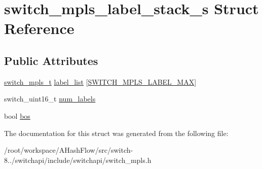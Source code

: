 \hypertarget{structswitch__mpls__label__stack__s}{\section{switch\+\_\+mpls\+\_\+label\+\_\+stack\+\_\+s Struct Reference}
\label{structswitch__mpls__label__stack__s}
}
\subsection*{Public Attributes}
\begin{DoxyCompactItemize}
\item 
\hyperlink{group__Tunnel_gaa1a400888248e1e756adbd37f010f288}{switch\+\_\+mpls\+\_\+t} \hyperlink{group__Tunnel_gaf21845a304f409165053ed260fc8da3e}{label\+\_\+list} \mbox{[}\hyperlink{group__Tunnel_ga358d11e6167bb874159a7b6ac253221b}{S\+W\+I\+T\+C\+H\+\_\+\+M\+P\+L\+S\+\_\+\+L\+A\+B\+E\+L\+\_\+\+M\+A\+X}\mbox{]}
\item 
switch\+\_\+uint16\+\_\+t \hyperlink{group__Tunnel_ga601501fd20b6f5d298fb0f06ce0897d5}{num\+\_\+labels}
\item 
bool \hyperlink{group__Tunnel_gaefae3f185e3c94cb263058c963043565}{bos}
\end{DoxyCompactItemize}


The documentation for this struct was generated from the following file\+:\begin{DoxyCompactItemize}
\item 
/root/workspace/\+A\+Hash\+Flow/src/switch-\/8../switchapi/include/switchapi/switch\+\_\+mpls.\+h\end{DoxyCompactItemize}
